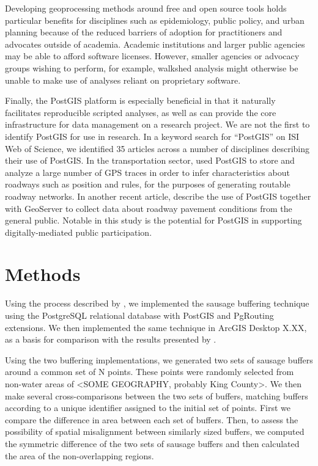 \documentclass[12pt,letterpaper]{article} %
\begin{document}
Developing geoprocessing methods around free and open source tools
holds particular benefits for disciplines such as epidemiology, public
policy, and urban planning because of the reduced barriers of adoption
for practitioners and advocates outside of academia. Academic
institutions and larger public agencies may be able to afford software
licenses. However, smaller agencies or advocacy groups wishing to
perform, for example, walkshed analysis might otherwise be unable to
make use of analyses reliant on proprietary software.

Finally, the PostGIS platform is especially beneficial in that it
naturally facilitates reproducible scripted analyses, as well as can
provide the core infrastructure for data management on a research
project. We are not the first to identify PostGIS for use in
research. In a keyword search for ``PostGIS'' on ISI Web of Science,
we identified 35 articles across a number of disciplines describing
their use of PostGIS. In the transportation sector,
\textcite{Wang2015routable} used PostGIS to store and analyze a large
number of GPS traces in order to infer characteristics about roadways
such as position and rules, for the purposes of generating routable
roadway networks. In another recent article,
\textcite{Brovelli2015FOSS} describe the use of PostGIS together with
GeoServer to collect data about roadway pavement conditions from the
general public. Notable in this study is the potential for PostGIS in
supporting digitally-mediated public participation.



\section*{Methods}
Using the process described by \textcite{Forsyth2014sausage}, we
implemented the sausage buffering technique using the PostgreSQL
relational database with PostGIS and PgRouting extensions. We then
implemented the same technique in ArcGIS Desktop X.XX, as a basis for
comparison with the results presented by
\citeauthor{Forsyth2014sausage}.

Using the two buffering implementations, we generated two sets of
sausage buffers around a common set of N points. These points were
randomly selected from non-water areas of <SOME GEOGRAPHY, probably
King County>. We then make several cross-comparisons between the two
sets of buffers, matching buffers according to a unique identifier
assigned to the initial set of points. First we compare the difference
in area between each set of buffers. Then, to assess the possibility
of spatial misalignment between similarly sized buffers, we computed
the symmetric difference of the two sets of sausage buffers and then
calculated the area of the non-overlapping regions.
\end{document}
